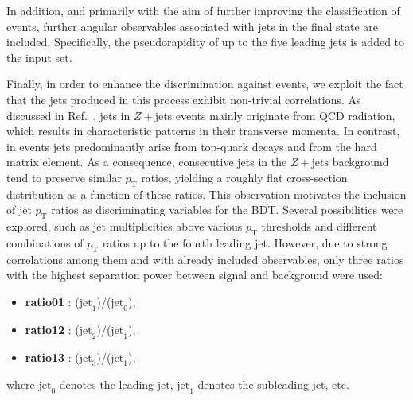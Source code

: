 In addition, and primarily with the aim of further improving the classification of \ttbar events, further angular observables associated with jets in the final state are included. Specifically, the pseudorapidity of up to the five leading jets is added to the input set.

Finally, in order to enhance the discrimination against \ztautau events, we exploit the fact that the jets produced in this process exhibit non-trivial correlations. As discussed in Ref.~\cite{ztt_jets}, jets in $Z+\text{jets}$ events mainly originate from QCD radiation, which results in characteristic patterns in their transverse momenta. In contrast, in \ttH events jets predominantly arise from top-quark decays and from the hard matrix element. As a consequence, consecutive jets in the $Z+\text{jets}$ background tend to preserve similar $p_{\text{T}}$ ratios, yielding a roughly flat cross-section distribution as a function of these ratios. This observation motivates the inclusion of jet $p_{\text{T}}$ ratios as discriminating variables for the BDT.  
Several possibilities were explored, such as jet multiplicities above various $p_{\text{T}}$ thresholds and different combinations of $p_{\text{T}}$ ratios up to the fourth leading jet. However, due to strong correlations among them and with already included observables, only three ratios with the highest separation power between signal and background were used:
\begin{itemize}
    \small
    \item \textbf{ratio01} : \pt($\text{jet}_1$)/\pt($\text{jet}_0$),
    \item \textbf{ratio12} : \pt($\text{jet}_2$)/\pt($\text{jet}_1$),
    \item \textbf{ratio13} : \pt($\text{jet}_3$)/\pt($\text{jet}_1$),
\end{itemize}
where $\text{jet}_0$ denotes the leading jet, $\text{jet}_1$ denotes the subleading jet, etc.

